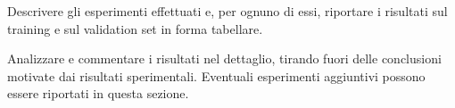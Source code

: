 Descrivere gli esperimenti effettuati e, per ognuno di essi, riportare i risultati sul training e sul validation set in forma tabellare.

Analizzare e commentare i risultati nel dettaglio, tirando fuori delle conclusioni motivate dai risultati sperimentali. Eventuali esperimenti aggiuntivi possono essere riportati in questa sezione.